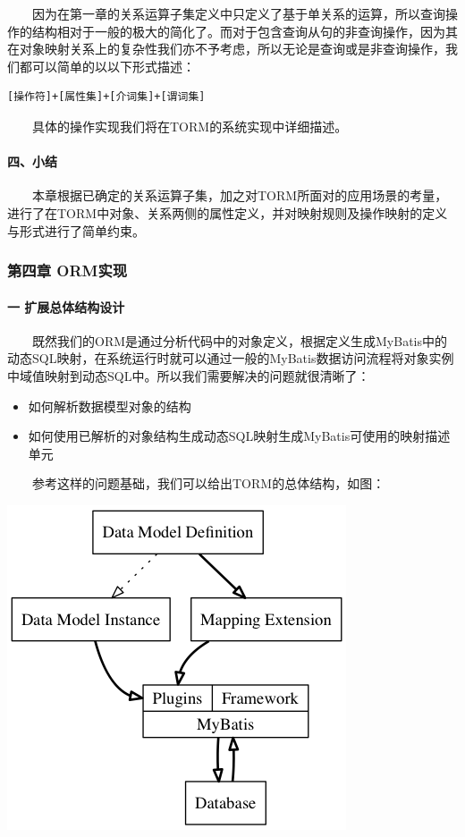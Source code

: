 \documentclass[]{article}
\begin{document}
　　因为在第一章的关系运算子集定义中只定义了基于单关系的运算，所以查询操作的结构相对于一般的极大的简化了。而对于包含查询从句的非查询操作，因为其在对象映射关系上的复杂性我们亦不予考虑，所以无论是查询或是非查询操作，我们都可以简单的以以下形式描述：

\begin{verbatim}
[操作符]+[属性集]+[介词集]+[谓词集]
\end{verbatim}

　　具体的操作实现我们将在TORM的系统实现中详细描述。

\paragraph{四、小结}\label{ux56dbux5c0fux7ed3}

　　本章根据已确定的关系运算子集，加之对TORM所面对的应用场景的考量，进行了在TORM中对象、关系两侧的属性定义，并对映射规则及操作映射的定义与形式进行了简单约束。

\subsubsection{第四章 ORM实现}\label{ux7b2cux56dbux7ae0-ormux5b9eux73b0}

\paragraph{一
扩展总体结构设计}\label{ux4e00-ux6269ux5c55ux603bux4f53ux7ed3ux6784ux8bbeux8ba1}

　　既然我们的ORM是通过分析代码中的对象定义，根据定义生成MyBatis中的动态SQL映射，在系统运行时就可以通过一般的MyBatis数据访问流程将对象实例中域值映射到动态SQL中。所以我们需要解决的问题就很清晰了：

\begin{itemize}
\itemsep1pt\parskip0pt
\item
  如何解析数据模型对象的结构
\item
  如何使用已解析的对象结构生成动态SQL映射生成MyBatis可使用的映射描述单元
\end{itemize}

　　参考这样的问题基础，我们可以给出TORM的总体结构，如图： 　　

\includegraphics{diagram/Design.png}
\end{document}
